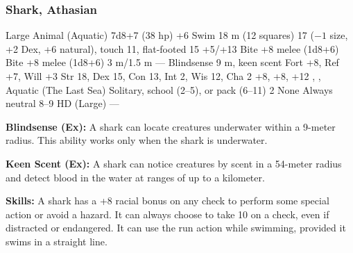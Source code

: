 \subsubsection{Shark, Athasian}
\begin{MonsterStats}
{Large Animal (Aquatic)}
{7d8+7 (38 hp)}
{+6}
{Swim 18 m (12 squares)}
{17 ($-1$ size, +2 Dex, +6 natural), touch 11, flat-footed 15}
{+5/+13}
{Bite +8 melee (1d8+6)}
{Bite +8 melee (1d8+6)}
{3 m/1.5 m}
{---}
{Blindsense 9 m, keen scent}
{Fort +8, Ref +7, Will +3}
{Str 18, Dex 15, Con 13, Int 2, Wis 12, Cha 2}
{ +8,  +8,  +12}
{, , }
{Aquatic (The Last Sea)}
{Solitary, school (2--5), or pack (6--11)}
{2}
{None}
{Always neutral}
{8--9 HD (Large)}
{---}
\end{MonsterStats}

\textbf{Blindsense (Ex):} A shark can locate creatures underwater within a 9-meter radius. This ability works only when the shark is underwater.

\textbf{Keen Scent (Ex):} A shark can notice creatures by scent in a 54-meter radius and detect blood in the water at ranges of up to a kilometer.

\textbf{Skills:} A shark has a +8 racial bonus on any  check to perform some special action or avoid a hazard. It can always choose to take 10 on a  check, even if distracted or endangered. It can use the run action while swimming, provided it swims in a straight line.
